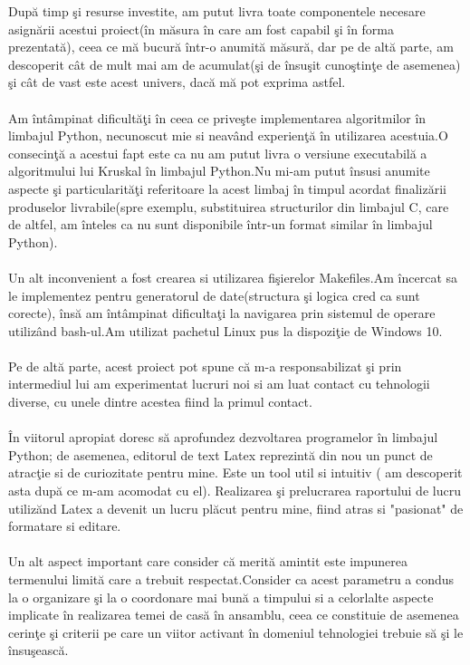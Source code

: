 \documentclass[14pt]{article}
\begin{document}
Dup\u{a} timp \c si resurse investite, am putut livra toate componentele necesare asign\u{a}rii acestui proiect(\^in m\u{a}sura \^in care am fost capabil \c si \^in forma prezentat\u{a}), ceea ce m\u{a} bucur\u{a} \^intr-o anumit\u{a} m\u{a}sur\u{a}, dar pe de alt\u{a} parte, am descoperit c\^at de mult mai am de acumulat(\c si de \^insu\c sit cuno\c stin\c te de asemenea) \c si c\^at de vast este acest univers, dac\u{a} m\u{a} pot exprima astfel.\\\\
Am \^int\^ampinat dificult\u{a}\c ti \^in ceea ce prive\c ste implementarea algoritmilor \^in limbajul Python, necunoscut mie si neav\^and experien\c t\u{a} \^in utilizarea acestuia.O consecin\c t\u{a} a acestui fapt este ca nu am putut livra o versiune executabil\u{a} a algoritmului lui Kruskal \^in limbajul Python.Nu mi-am putut \^insusi anumite aspecte \c si particularit\u{a}\c ti referitoare la acest limbaj \^in timpul acordat finaliz\u{a}rii produselor livrabile(spre exemplu, substituirea structurilor din limbajul C, care de altfel, am \^inteles ca nu sunt disponibile \^intr-un format similar \^in limbajul Python).\\\\
Un alt inconvenient a fost crearea si utilizarea fi\c sierelor Makefiles.Am \^incercat sa le implementez pentru generatorul de date(structura \c si logica cred ca sunt corecte), \^ins\u{a} am \^int\^ampinat dificulta\c ti la navigarea prin sistemul de operare utiliz\^and bash-ul.Am utilizat pachetul Linux pus la dispozi\c tie de Windows 10.\\\\
Pe de alt\u{a} parte, acest proiect pot spune c\u{a} m-a responsabilizat \c si prin intermediul lui am experimentat lucruri noi si am luat contact cu tehnologii diverse, cu unele dintre acestea fiind la primul contact.\\\\
\^In viitorul apropiat doresc s\u{a} aprofundez dezvoltarea programelor \^in limbajul Python; de asemenea, editorul de text Latex reprezint\u{a} din nou un punct de atrac\c tie si de curiozitate pentru mine. Este un tool util si intuitiv ( am descoperit asta dup\u{a} ce m-am acomodat cu el). Realizarea \c si prelucrarea raportului de lucru utiliz\u{a}nd Latex a devenit un lucru pl\u{a}cut pentru mine, fiind atras si "pasionat" de formatare si editare.\\\\
Un alt aspect important care consider c\u{a} merit\u{a} amintit este impunerea termenului limit\u{a} care a trebuit respectat.Consider ca acest parametru a condus la o organizare \c si la o coordonare mai bun\u{a} a timpului si a celorlalte aspecte implicate \^in realizarea temei de cas\u{a} \^in ansamblu, ceea ce constituie de asemenea cerin\c te \c si criterii pe care un viitor activant \^in domeniul tehnologiei trebuie s\u{a} \c si le \^insu\c seasc\u{a}.
\\
\\
\end{document}
